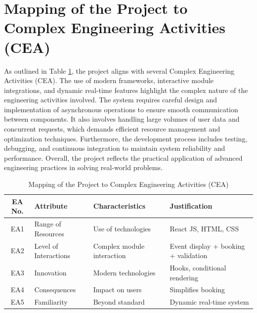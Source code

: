 \documentclass[12pt]{report}
\begin{document}
\vspace{0.6cm}
\section{Mapping of the Project to Complex Engineering Activities (CEA)}

As outlined in Table \ref{tab:cea_mapping}, the project aligns with several Complex Engineering Activities (CEA). The use of modern frameworks, interactive module integrations, and dynamic real-time features highlight the complex nature of the engineering activities involved. The system requires careful design and implementation of asynchronous operations to ensure smooth communication between components. It also involves handling large volumes of user data and concurrent requests, which demands efficient resource management and optimization techniques. Furthermore, the development process includes testing, debugging, and continuous integration to maintain system reliability and performance. Overall, the project reflects the practical application of advanced engineering practices in solving real-world problems.


\begin{table}[H]
\centering
\renewcommand{\arraystretch}{1.4}
\setlength{\tabcolsep}{6pt}

\begin{tabular}{|c|l|l|p{7cm}|}
\hline
\textbf{EA No.} & \textbf{Attribute} & \textbf{Characteristics} & \textbf{Justification} \\
\hline
EA1 & Range of Resources & Use of technologies & React JS, HTML, CSS \\
\hline
EA2 & Level of Interactions & Complex module interaction & Event display + booking + validation \\
\hline
EA3 & Innovation & Modern technologies & Hooks, conditional rendering \\
\hline
EA4 & Consequences & Impact on users & Simplifies booking \\
\hline
EA5 & Familiarity & Beyond standard & Dynamic real-time system \\
\hline
\end{tabular}

\caption{ Mapping of the Project to Complex Engineering Activities (CEA)}
\label{tab:cea_mapping}
\end{table}

\vspace{0.6cm}

\end{document}
